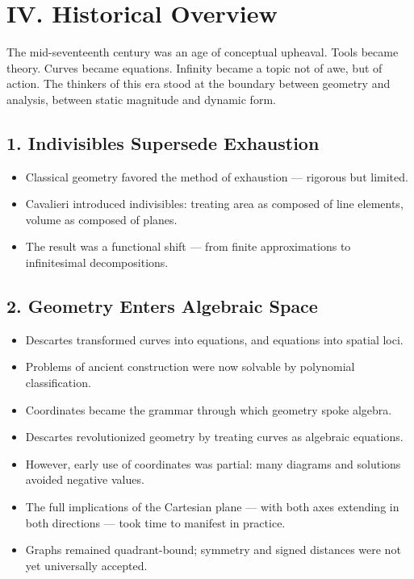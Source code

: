 \documentclass[9pt]{article}
\begin{document}
\newpage

\section*{IV. Historical Overview}

The mid-seventeenth century was an age of conceptual upheaval. Tools became theory. Curves became equations. Infinity became a topic not of awe, but of action. The thinkers of this era stood at the boundary between geometry and analysis, between static magnitude and dynamic form.

\subsection*{1. Indivisibles Supersede Exhaustion}
\begin{itemize}
  \item Classical geometry favored the method of exhaustion — rigorous but limited.
  \item Cavalieri introduced indivisibles: treating area as composed of line elements, volume as composed of planes.
  \item The result was a functional shift — from finite approximations to infinitesimal decompositions.
\end{itemize}

\subsection*{2. Geometry Enters Algebraic Space}
\begin{itemize}
  \item Descartes transformed curves into equations, and equations into spatial loci.
  \item Problems of ancient construction were now solvable by polynomial classification.
  \item Coordinates became the grammar through which geometry spoke algebra.
  \item Descartes revolutionized geometry by treating curves as algebraic equations.
  \item However, early use of coordinates was partial: many diagrams and solutions avoided negative values.
  \item The full implications of the Cartesian plane — with both axes extending in both directions — took time to manifest in practice.
  \item Graphs remained quadrant-bound; symmetry and signed distances were not yet universally accepted.
\end{itemize}
\end{document}
